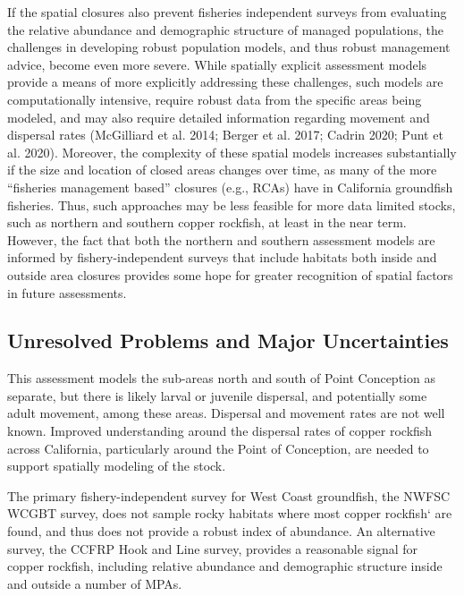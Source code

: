\documentclass[11pt,
  english,
  letterpaper,
]{article}
\begin{document}
If the spatial closures also prevent fisheries independent surveys from evaluating the relative abundance and demographic structure of managed populations, the challenges in developing robust population models, and thus robust management advice, become even more severe. While spatially explicit assessment models provide a means of more explicitly addressing these challenges, such models are computationally intensive, require robust data from the specific areas being modeled, and may also require detailed information regarding movement and dispersal rates (McGilliard et al. 2014; Berger et al. 2017; Cadrin 2020; Punt et al. 2020). Moreover, the complexity of these spatial models increases substantially if the size and location of closed areas changes over time, as many of the more ``fisheries management based'' closures (e.g., RCAs) have in California groundfish fisheries. Thus, such approaches may be less feasible for more data limited stocks, such as northern and southern copper rockfish, at least in the near term. However, the fact that both the northern and southern assessment models are informed by fishery-independent surveys that include habitats both inside and outside area closures provides some hope for greater recognition of spatial factors in future assessments.

\hypertarget{unresolved-problems-and-major-uncertainties-1}{%
\subsection{Unresolved Problems and Major Uncertainties}\label{unresolved-problems-and-major-uncertainties-1}}

This assessment models the sub-areas north and south of Point Conception as separate, but there is likely larval or juvenile dispersal, and potentially some adult movement, among these areas. Dispersal and movement rates are not well known. Improved understanding around the dispersal rates of copper rockfish across California, particularly around the Point of Conception, are needed to support spatially modeling of the stock.

The primary fishery-independent survey for West Coast groundfish, the NWFSC WCGBT survey, does not sample rocky habitats where most copper rockfish` are found, and thus does not provide a robust index of abundance. An alternative survey, the CCFRP Hook and Line survey, provides a reasonable signal for copper rockfish, including relative abundance and demographic structure inside and outside a number of MPAs.
\end{document}
